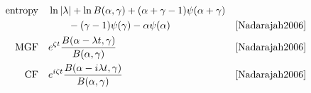 \begin{table*}[tp!]
\begin{align*}
\\
\text{entropy} \quad  & \ln |\lambda| +\ln B(\alpha,\gamma) + (\alpha+\gamma-1) \psi(\alpha+\gamma) 
\\ & \qquad 
- (\gamma -1) \psi(\gamma) - \alpha \psi(\alpha)  &\text{\cite{Nadarajah2006}}
\\
\text{MGF} \quad  &e^{\zeta t }  \frac{B(\alpha-\lambda t, \gamma) }{B(\alpha,\gamma)}  & \text{\cite{Nadarajah2006}}
\\                                                                                                                                              
\text{CF} \quad  & e^{i \zeta t }   \frac{B(\alpha-i \lambda t, \gamma) }{B(\alpha,\gamma)}   & \text{\cite{Nadarajah2006}}
\end{align*}
\end{table*}
